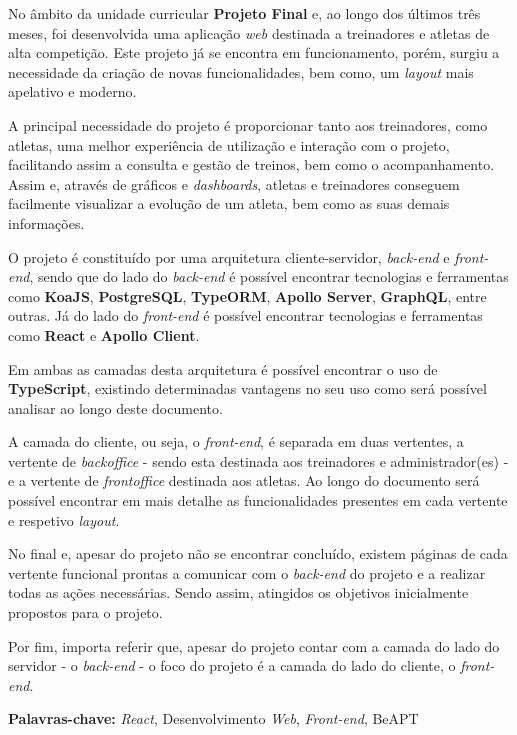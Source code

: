 
No âmbito da unidade curricular \textbf{Projeto Final} e, ao longo dos últimos três meses, foi desenvolvida uma aplicação \textit{web} destinada a treinadores e atletas de alta competição. Este projeto já se encontra em funcionamento, porém, surgiu a necessidade da criação de novas funcionalidades, bem como, um \textit{layout} mais apelativo e moderno.

A principal necessidade do projeto é proporcionar tanto aos treinadores, como atletas, uma melhor experiência de utilização e interação com o projeto, facilitando assim a consulta e gestão de treinos, bem como o acompanhamento. Assim e, através de gráficos e \textit{dashboards}, atletas e treinadores conseguem facilmente visualizar a evolução de um atleta, bem como as suas demais informações.

O projeto é constituído por uma arquitetura cliente-servidor, \textit{back-end} e \textit{front-end}, sendo que do lado do \textit{back-end} é possível encontrar tecnologias e ferramentas como \textbf{KoaJS}, \textbf{PostgreSQL}, \textbf{TypeORM}, \textbf{Apollo Server}, \textbf{GraphQL}, entre outras. Já do lado do \textit{front-end} é possível encontrar tecnologias e ferramentas como \textbf{React} e \textbf{Apollo Client}.

Em ambas as camadas desta arquitetura é possível encontrar o uso de \textbf{TypeScript}, existindo determinadas vantagens no seu uso como será possível analisar ao longo deste documento.

A camada do cliente, ou seja, o \textit{front-end}, é separada em duas vertentes, a vertente de \textit{backoffice} - sendo esta destinada aos treinadores e administrador(es) - e a vertente de \textit{frontoffice} destinada aos atletas. Ao longo do documento será possível encontrar em mais detalhe as funcionalidades presentes em cada vertente e respetivo \textit{layout}.

No final e, apesar do projeto não se encontrar concluído, existem páginas de cada vertente funcional prontas a comunicar com o \textit{back-end} do projeto e a realizar todas as ações necessárias.  Sendo assim, atingidos os objetivos inicialmente propostos para o projeto.

Por fim, importa referir que, apesar do projeto contar com a camada do lado do servidor - o \textit{back-end} - o foco do projeto é a camada do lado do cliente, o \textit{front-end}.

\vfill

\textbf{Palavras-chave:} \textit{React}, Desenvolvimento \textit{Web}, \textit{Front-end}, BeAPT

\newpage